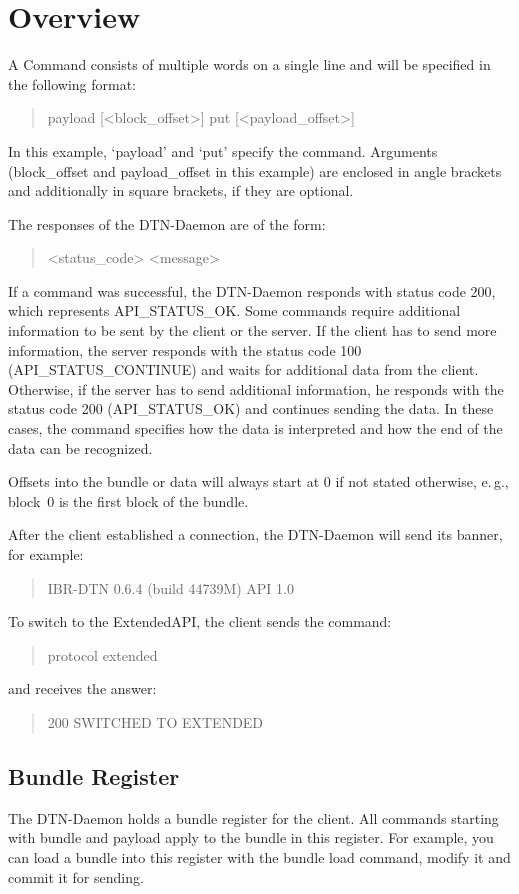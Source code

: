 \documentclass[12pt, a4paper]{scrartcl}
\begin{document}
\section{Overview}
A Command consists of multiple words on a single line and will be specified in the following format:
\begin{quote}
	payload [<block\_offset>] put [<payload\_offset>]
\end{quote}
In this example, `payload' and `put' specify the command.
Arguments (block\_offset and payload\_offset in this example) are enclosed in angle brackets and additionally in square brackets, if they are optional.

The responses of the DTN-Daemon are of the form:
\begin{quote}
	<status\_code> <message>
\end{quote}

If a command was successful, the DTN-Daemon responds with status code 200, which represents API\_STATUS\_OK.
Some commands require additional information to be sent by the client or the server.
If the client has to send more information, the server responds with the status code 100 (API\_STATUS\_CONTINUE) and waits for additional data from the client.
Otherwise, if the server has to send additional information, he responds with the status code 200 (API\_STATUS\_OK) and continues sending the data.
In these cases, the command specifies how the data is interpreted and how the end of the data can be recognized.

Offsets into the bundle or data will always start at 0 if not stated otherwise, e.\,g., block~0 is the first block of the bundle.

After the client established a connection, the DTN-Daemon will send its banner, for example:
\begin{quote}
IBR-DTN 0.6.4 (build 44739M) API 1.0
\end{quote}
To switch to the ExtendedAPI, the client sends the command:
\begin{quote}
	protocol extended
\end{quote}
and receives the answer:
\begin{quote}
	200 SWITCHED TO EXTENDED
\end{quote}

\subsection{Bundle Register}
The DTN-Daemon holds a bundle register for the client.
All commands starting with bundle and payload apply to the bundle in this register.
For example, you can load a bundle into this register with the bundle load command, modify it and commit it for sending.
\end{document}
